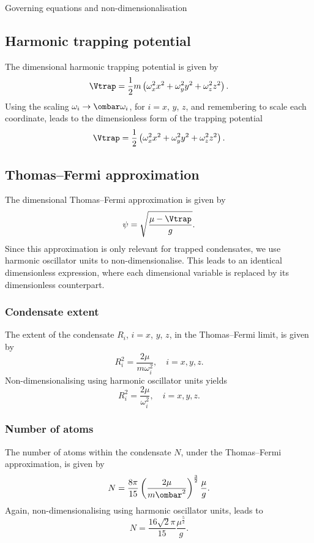 \begin{chapter}{\label{cha:equations}Governing equations and
  non-dimensionalisation}
  \subsection{Harmonic trapping potential}
  The dimensional harmonic trapping potential is given by
  \begin{equation}
    \Vtrap = \frac{1}{2} m \left( \omega_{x}^{2} x^{2} + \omega_{y}^{2} y^{2} +
    \omega_{z}^{2} z^{2} \right).
    \label{eqn:trap}
  \end{equation}
  Using the scaling $\omega_{i} \to \ombar \omega_{i}$, for $i=x$, $y$, $z$,
  and remembering to scale each coordinate, leads to the dimensionless form of
  the trapping potential
  \begin{equation*}
    \Vtrap = \frac{1}{2} \left( \omega_{x}^{2} x^{2} + \omega_{y}^{2} y^{2} +
    \omega_{z}^{2} z^{2} \right).
  \end{equation*}

  \subsection{Thomas--Fermi approximation}
  The dimensional Thomas--Fermi approximation is given by
  \begin{equation*}
    \psi = \sqrt{\frac{\mu-\Vtrap}{g}}.
  \end{equation*}
  Since this approximation is only relevant for trapped condensates, we use
  harmonic oscillator units to non-dimensionalise.  This leads to an identical
  dimensionless expression, where each dimensional variable is replaced by its
  dimensionless counterpart.

  \subsubsection{Condensate extent}
  The extent of the condensate $R_{i}$, $i = x$, $y$, $z$, in the Thomas--Fermi
  limit, is given by
  \begin{equation*}
    R_{i}^{2} = \frac{2\mu}{m\omega_{i}^{2}}, \quad i = x, y, z.
  \end{equation*}
  Non-dimensionalising using harmonic oscillator units yields
  \begin{equation*}
    R_{i}^{2} = \frac{2\mu}{\omega_{i}^{2}}, \quad i = x, y, z.
  \end{equation*}

  \subsubsection{Number of atoms}
  The number of atoms within the condensate $N$, under the Thomas--Fermi
  approximation, is given by
  \begin{equation*}
    N = \frac{8\pi}{15} \left( \frac{2\mu}{m\ombar^2} \right)^{\frac{3}{2}}
    \frac{\mu}{g}.
  \end{equation*}
  Again, non-dimensionalising using harmonic oscillator units, leads to
  \begin{equation*}
    N = \frac{16\sqrt{2}\pi}{15} \frac{\mu^{\frac{5}{2}}}{g}.
  \end{equation*}


\end{chapter}
